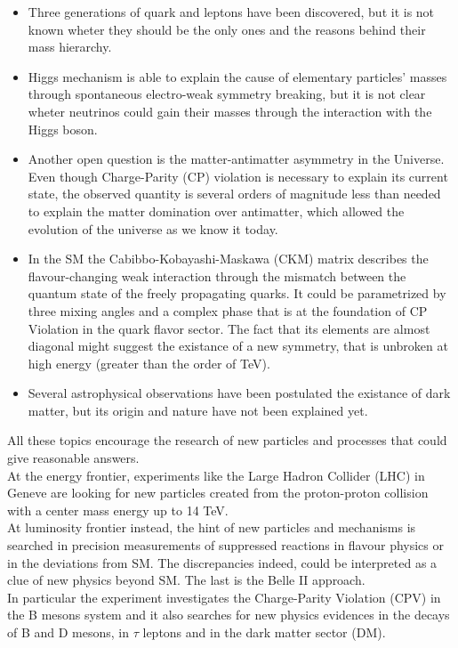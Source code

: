 \begin{itemize}
\item Three generations of quark and leptons have been discovered, but it is not known wheter they should be the only ones and the reasons behind their mass hierarchy.
\item Higgs mechanism is able to explain the cause of elementary particles' masses through spontaneous electro-weak symmetry breaking, but it is not clear wheter neutrinos could gain their masses through the interaction with the Higgs boson.
\item Another open question is the matter-antimatter asymmetry in the Universe. Even though Charge-Parity (CP) violation is necessary to explain its current state, the observed quantity is several orders of magnitude less than needed to explain the matter domination over antimatter, which allowed the evolution of the universe as we know it today.
\item In the SM the Cabibbo-Kobayashi-Maskawa (CKM) matrix describes the flavour-changing weak interaction through the mismatch between the quantum state of the freely propagating quarks. It could be parametrized by three mixing angles and a complex phase that is at the foundation of CP Violation in the quark flavor sector. The fact that its elements are almost diagonal might suggest the existance of a new symmetry, that is unbroken at high energy (greater than the order of TeV).
\item Several astrophysical observations have been postulated the existance of dark matter, but its origin and nature have not been explained yet.
\end{itemize}

All these topics encourage the research of new particles and processes that could give reasonable answers.\\
At the energy frontier, experiments like the Large Hadron Collider (LHC) in Geneve are looking for new particles created from the proton-proton collision with a center mass energy up to 14 TeV.\\
At luminosity frontier instead, the hint of new particles and mechanisms is searched in precision measurements of suppressed reactions in flavour physics or in the deviations from SM. The discrepancies indeed, could be interpreted as a clue of new physics beyond SM. The last is the Belle II approach.\\


In particular the experiment investigates the Charge-Parity Violation (CPV) in the B mesons system and it also searches for new physics evidences in the decays of B and D mesons, in $\tau$ leptons and in the dark matter sector (DM).

